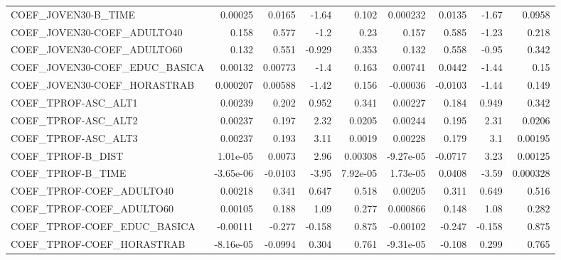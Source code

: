 \begin{tabular}{lrrrrrrrr}
COEF\_JOVEN30-B\_TIME               &     0.00025 &       0.0165 &   -1.64 &    0.102 &   0.000232 &      0.0135 &        -1.67 &        0.0958 \\
COEF\_JOVEN30-COEF\_ADULTO40        &       0.158 &        0.577 &    -1.2 &     0.23 &      0.157 &       0.585 &        -1.23 &         0.218 \\
COEF\_JOVEN30-COEF\_ADULTO60        &       0.132 &        0.551 &  -0.929 &    0.353 &      0.132 &       0.558 &        -0.95 &         0.342 \\
COEF\_JOVEN30-COEF\_EDUC\_BASICA     &     0.00132 &      0.00773 &    -1.4 &    0.163 &    0.00741 &      0.0442 &        -1.44 &          0.15 \\
COEF\_JOVEN30-COEF\_HORASTRAB       &    0.000207 &      0.00588 &   -1.42 &    0.156 &   -0.00036 &     -0.0103 &        -1.44 &         0.149 \\
COEF\_TPROF-ASC\_ALT1               &     0.00239 &        0.202 &   0.952 &    0.341 &    0.00227 &       0.184 &        0.949 &         0.342 \\
COEF\_TPROF-ASC\_ALT2               &     0.00237 &        0.197 &    2.32 &   0.0205 &    0.00244 &       0.195 &         2.31 &        0.0206 \\
COEF\_TPROF-ASC\_ALT3               &     0.00237 &        0.193 &    3.11 &   0.0019 &    0.00228 &       0.179 &          3.1 &       0.00195 \\
COEF\_TPROF-B\_DIST                 &    1.01e-05 &       0.0073 &    2.96 &  0.00308 &  -9.27e-05 &     -0.0717 &         3.23 &       0.00125 \\
COEF\_TPROF-B\_TIME                 &   -3.65e-06 &      -0.0103 &   -3.95 & 7.92e-05 &   1.73e-05 &      0.0408 &        -3.59 &      0.000328 \\
COEF\_TPROF-COEF\_ADULTO40          &     0.00218 &        0.341 &   0.647 &    0.518 &    0.00205 &       0.311 &        0.649 &         0.516 \\
COEF\_TPROF-COEF\_ADULTO60          &     0.00105 &        0.188 &    1.09 &    0.277 &   0.000866 &       0.148 &         1.08 &         0.282 \\
COEF\_TPROF-COEF\_EDUC\_BASICA       &    -0.00111 &       -0.277 &  -0.158 &    0.875 &   -0.00102 &      -0.247 &       -0.158 &         0.875 \\
COEF\_TPROF-COEF\_HORASTRAB         &   -8.16e-05 &      -0.0994 &   0.304 &    0.761 &  -9.31e-05 &      -0.108 &        0.299 &         0.765 \\

\end{tabular}

